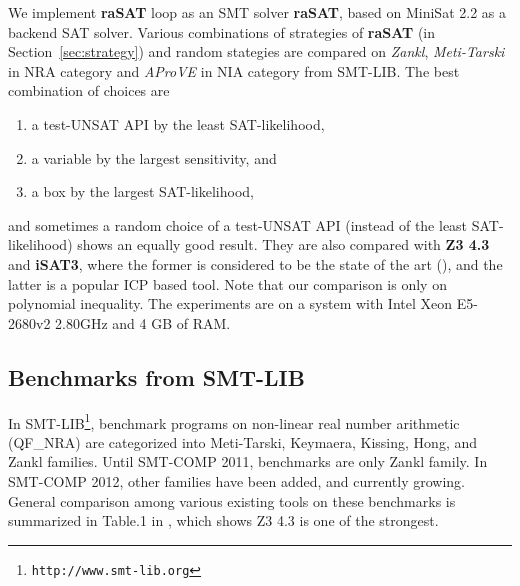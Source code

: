 \documentclass[runningheads,a4paper,oribibl]{llncs}
\begin{document}
We implement \textbf{raSAT} loop as an SMT solver {\bf raSAT}, 
based on MiniSat 2.2 as a backend SAT solver. 
Various combinations of strategies of {\bf raSAT} (in Section~\ref{sec:strategy})
and random stategies are compared on {\em Zankl}, {\em Meti-Tarski} in NRA category 
and {\em AProVE} in NIA category from SMT-LIB. 
The best combination of choices are 
\begin{enumerate}
\item a test-UNSAT API by the least SAT-likelihood, 
\item a variable by the largest sensitivity, and 
\item a box by the largest SAT-likelihood, 
\end{enumerate} 
and sometimes a random choice of a test-UNSAT API (instead of the least SAT-likelihood) 
shows an equally good result. 
They are also compared with \textbf{Z3 4.3} and \textbf{iSAT3}, 
where the former is considered to be the state of the art (\cite{Jovanovic13}), and 
the latter is a popular ICP based tool. 
Note that our comparison is only on polynomial inequality. 
The experiments are on a system with Intel Xeon E5-2680v2 2.80GHz and 4 GB of RAM. 


\subsection{Benchmarks from SMT-LIB} \label{sec:expsmtlib}

In SMT-LIB\footnote{\tt http://www.smt-lib.org}, 
benchmark programs on non-linear real number arithmetic 
(QF\_NRA) are categorized into Meti-Tarski, Keymaera, Kissing, Hong, and Zankl families. 
Until SMT-COMP 2011, benchmarks are only Zankl family. 
In SMT-COMP 2012, other families have been added, and currently growing. 
General comparison among various existing tools on these benchmarks is summarized in 
Table.1 in \cite{Jovanovic13}, which shows Z3 4.3 is one of the strongest. 
\end{document}
